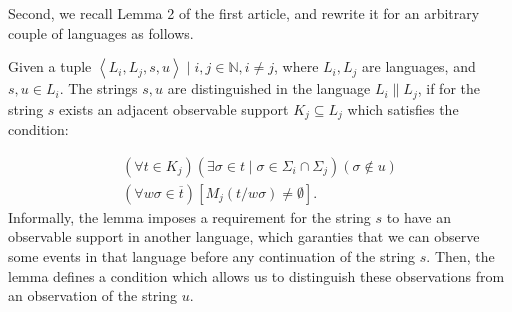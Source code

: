 \documentclass[a4paper, 10pt, conference]{ieeeconf}
\begin{document}
Second, we recall Lemma 2 of the first article, and rewrite it for an arbitrary
couple of languages as follows.

\begin{lemma}
Given a tuple $\left< L_i, L_j, s, u\right> \mid i, j \in \mathbb{N}, i\neq j$,
where $L_i, L_j$ are languages, and $s, u \in L_i$. The strings $s, u$ are
distinguished in the language $L_i \parallel L_j$, if for the string $s$ exists
an adjacent observable support $K_j \subseteq L_j$ which satisfies the
condition:
\end{lemma} 
\begin{equation}
\label{con:distinquished}
	\begin{array}{l}
	 	(\forall t \in K_j)
	 	(\exists \sigma \in t \mid \sigma \in \Sigma_i \cap \Sigma_j)
	 	(\sigma \not \in u)
	 	\\
	 	(\forall w\sigma \in \overline{t})
	 	[M_j(t / w\sigma) \neq \emptyset].
	\end{array}
\end{equation}
Informally, the lemma imposes a requirement for the string $s$ to have an
observable support in another language, which garanties that we can observe some
events in that language before any continuation of the string $s$.
Then, the lemma defines a condition which allows us to distinguish these
observations from an observation of the string $u$.
\end{document}
